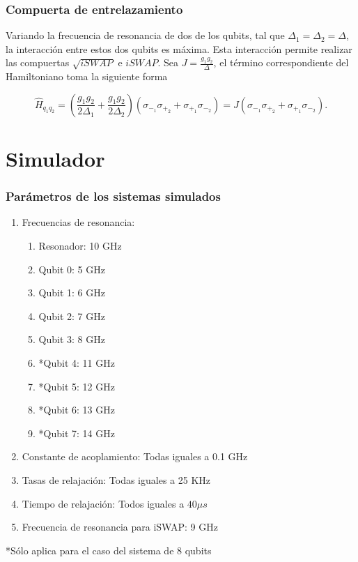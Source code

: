 \documentclass[xetex,mathserif,serif, 8pt]{beamer}
\begin{document}
\begin{frame}
    \frametitle{Compuerta de entrelazamiento}

    Variando la frecuencia de resonancia de dos de los qubits, tal que $\Delta_1 = \Delta_2 = \Delta$, la interacción entre estos dos qubits es máxima. Esta interacción permite realizar las compuertas $\sqrt{iSWAP}$ e $iSWAP$. Sea $J = \frac{g_1 g_2}{\Delta}$, el término correspondiente del Hamiltoniano toma la siguiente forma

    \begin{equation}
        \hat{H}_{q_1 q_2} = (\frac{g_1 g_2}{2 \Delta_1} + \frac{g_1 g_2}{2 \Delta_2}) (\sigma_{-_1} \sigma_{+_2} + \sigma_{+_1} \sigma_{-_2}) = J (\sigma_{-_1} \sigma_{+_2} + \sigma_{+_1} \sigma_{-_2}) .
    \end{equation}

\end{frame}

\section{Simulador}

\begin{frame}
    \frametitle{Parámetros de los sistemas simulados}

    \begin{enumerate}
        \item Frecuencias de resonancia:
            \begin{enumerate}
                \item Resonador: 10 GHz
                \item Qubit 0: 5 GHz
                \item Qubit 1: 6 GHz
                \item Qubit 2: 7 GHz
                \item Qubit 3: 8 GHz
                \item *Qubit 4: 11 GHz
                \item *Qubit 5: 12 GHz
                \item *Qubit 6: 13 GHz
                \item *Qubit 7: 14 GHz
            \end{enumerate}
        \item Constante de acoplamiento: Todas iguales a 0.1 GHz
        \item Tasas de relajación: Todas iguales a 25 KHz
        \item Tiempo de relajación: Todos iguales a $40 \mu s$
        \item Frecuencia de resonancia para iSWAP: 9 GHz
    \end{enumerate}

    *Sólo aplica para el caso del sistema de 8 qubits

\end{frame}
\end{document}
